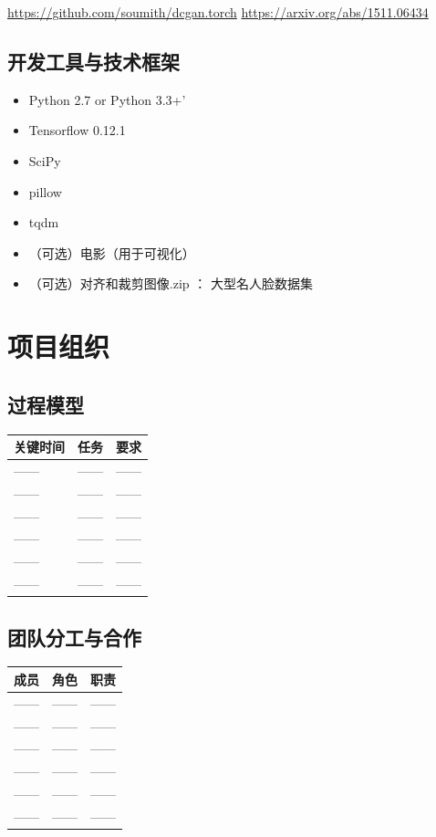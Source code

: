 \documentclass[
  hyperref, a4paper]{ctexart}
\begin{document}
\url{https://github.com/soumith/dcgan.torch}
\url{https://arxiv.org/abs/1511.06434}

\hypertarget{ux5f00ux53d1ux5de5ux5177ux4e0eux6280ux672fux6846ux67b6}{%
\subsection{开发工具与技术框架}\label{ux5f00ux53d1ux5de5ux5177ux4e0eux6280ux672fux6846ux67b6}}

\begin{itemize}
\item
  Python 2.7 or Python 3.3+'
\item
  Tensorflow 0.12.1
\item
  SciPy
\item
  pillow
\item
  tqdm
\item
  （可选）电影（用于可视化）
\item
  （可选）对齐和裁剪图像.zip ： 大型名人脸数据集
\end{itemize}

\hypertarget{ux9879ux76eeux7ec4ux7ec7}{%
\section{项目组织}\label{ux9879ux76eeux7ec4ux7ec7}}

\hypertarget{ux8fc7ux7a0bux6a21ux578b}{%
\subsection{过程模型}\label{ux8fc7ux7a0bux6a21ux578b}}

\begin{longtable}[]{@{}lll@{}}
\toprule
关键时间 & 任务 & 要求\tabularnewline
\midrule
\endhead
------ & ------ & ------\tabularnewline
------ & ------ & ------\tabularnewline
------ & ------ & ------\tabularnewline
------ & ------ & ------\tabularnewline
------ & ------ & ------\tabularnewline
------ & ------ & ------\tabularnewline
\bottomrule
\end{longtable}

\hypertarget{ux56e2ux961fux5206ux5de5ux4e0eux5408ux4f5c}{%
\subsection{团队分工与合作}\label{ux56e2ux961fux5206ux5de5ux4e0eux5408ux4f5c}}

\begin{longtable}[]{@{}lll@{}}
\toprule
成员 & 角色 & 职责\tabularnewline
\midrule
\endhead
------ & ------ & ------\tabularnewline
------ & ------ & ------\tabularnewline
------ & ------ & ------\tabularnewline
------ & ------ & ------\tabularnewline
------ & ------ & ------\tabularnewline
------ & ------ & ------\tabularnewline
\bottomrule
\end{longtable}
\end{document}

